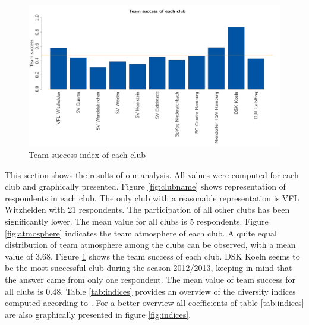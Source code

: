 \documentclass[	
	12pt, %
	a4paper, %
]{scrartcl}\usepackage[]{graphicx}\usepackage[]{color}
\newenvironment{knitrout}{}{} %
\begin{document}
\begin{knitrout}\footnotesize
{}\color{fgcolor}\begin{figure}[]


{\centering \includegraphics[width=1\linewidth]{figure/beamer-teamsuccess} 

}

\caption[Team success index of each club]{Team success index of each club\label{fig:teamsuccess}}
\end{figure}


\end{knitrout}

This section shows the results of our analysis. All values were computed for each club and graphically presented. Figure \ref{fig:clubname} shows representation of respondents in each club. The only club with a reasonable representation is VFL Witzhelden with 21 respondents. The participation of all other clubs has been significantly lower. The mean value for all clubs is 5 respondents. Figure \ref{fig:atmosphere} indicates the team atmosphere of each club. A quite equal distribution of team atmosphere among the clubs can be observed, with a mean value of 3.68. Figure \ref{fig:teamsuccess} shows the team success of each club. DSK Koeln seems to be the most successful club during the season 2012/2013, keeping in mind that the answer came from only one respondent. The mean value of team success for all clubs is 0.48. Table \ref{tab:indices} provides an overview of the diversity indices computed according to . For a better overview all coefficients of table \ref{tab:indices} are also graphically presented in figure \ref{fig:indices}.
\end{document}
